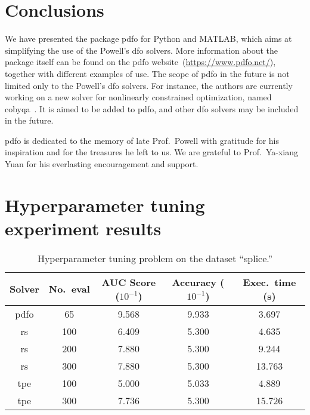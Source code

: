 \documentclass[
    smallextended,  %
    draft,          %
]{svjour3}
\begin{document}
\section{Conclusions}
\label{sec:conclude}

We have presented the package \gls{pdfo} for Python and MATLAB, which aims at simplifying the use of the Powell's \gls{dfo} solvers.
More information about the package itself can be found on the \gls{pdfo} website~(\url{https://www.pdfo.net/}), together with different examples of use.
The scope of \gls{pdfo} in the future is not limited only to the Powell's \gls{dfo} solvers.
For instance, the authors are currently working on a new solver for nonlinearly constrained optimization, named \gls{cobyqa}~\cite{Ragonneau_2022}.
It is aimed to be added to \gls{pdfo}, and other \gls{dfo} solvers may be included in the future.

\begin{acknowledgements}
    \Gls{pdfo} is dedicated to the memory of late Prof.\ Powell with gratitude for his inspiration and for the treasures he left to us.
    We are grateful to Prof.\ Ya-xiang Yuan for his everlasting encouragement and support.
\end{acknowledgements}




\appendix

\section{Hyperparameter tuning experiment results}
\label{sec:htres}

\begin{table}[!ht]
    \caption{Hyperparameter tuning problem on the dataset ``splice.''}
    \centering
    \begin{tabular}{cS[table-format=3]SSS}
        \toprule
        Solver      & {No.\ eval}   & {AUC Score ($10^{-1}$)}   & {Accuracy ($10^{-1}$)}    & {Exec.\ time (\si{\second})}\\
        \midrule
        \Gls{pdfo}  & 65            & 9.568                     & 9.933                     & 3.697\\
        \Gls{rs}    & 100           & 6.409                     & 5.300                     & 4.635\\
        \Gls{rs}    & 200           & 7.880                     & 5.300                     & 9.244\\
        \Gls{rs}    & 300           & 7.880                     & 5.300                     & 13.763\\
        \Gls{tpe}   & 100           & 5.000                     & 5.033                     & 4.889\\
        \Gls{tpe}   & 300           & 7.736                     & 5.300                     & 15.726\\
        \bottomrule
    \end{tabular}
\end{table}
\end{document}
